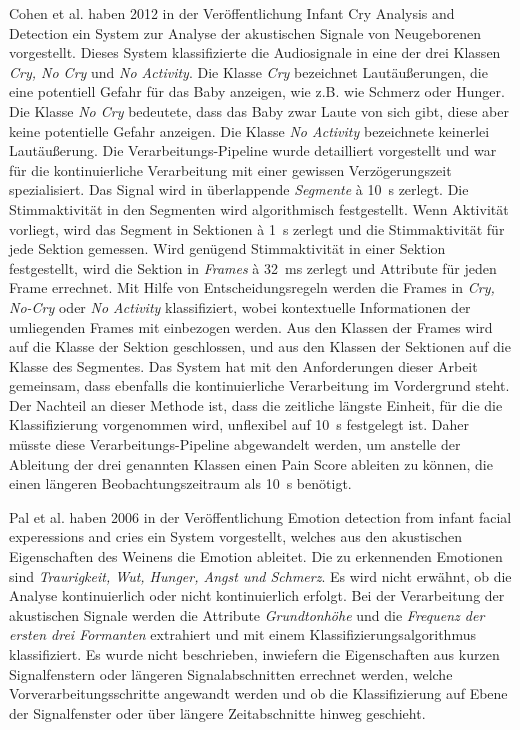 Cohen et al. haben 2012 in der Veröffentlichung \glqq Infant Cry Analysis and Detection\grqq{} \cite{cohenCry}  ein System zur Analyse der akustischen Signale von Neugeborenen vorgestellt. Dieses System klassifizierte die Audiosignale in eine der drei Klassen \emph{Cry, No Cry} und \emph{No Activity}. Die Klasse \emph{Cry} bezeichnet Lautäußerungen, die eine potentiell Gefahr für das Baby anzeigen, wie z.B. wie Schmerz oder Hunger. Die Klasse \emph{No Cry} bedeutete, dass das Baby zwar Laute von sich gibt, diese aber keine potentielle Gefahr anzeigen. Die Klasse \emph{No Activity} bezeichnete keinerlei Lautäußerung. Die Verarbeitungs-Pipeline wurde detailliert vorgestellt und war für die kontinuierliche Verarbeitung mit einer gewissen Verzögerungszeit spezialisiert. Das Signal wird in überlappende \emph{Segmente} \`{a} \SI{10}{\second} zerlegt. Die Stimmaktivität in den Segmenten wird algorithmisch festgestellt. Wenn Aktivität vorliegt, wird das Segment in Sektionen \`{a} \SI{1}{\second} zerlegt und die Stimmaktivität für jede Sektion gemessen. Wird genügend Stimmaktivität in einer Sektion festgestellt, wird die Sektion in \emph{Frames} \`{a} \SI{32}{\milli\second} zerlegt und Attribute für jeden Frame errechnet. Mit Hilfe von Entscheidungsregeln werden die Frames in \emph{Cry, No-Cry} oder \emph{No Activity} klassifiziert, wobei kontextuelle Informationen der umliegenden Frames mit einbezogen werden. Aus den Klassen der Frames wird auf die Klasse der Sektion geschlossen, und aus den Klassen der Sektionen auf die Klasse des Segmentes. Das System hat mit den Anforderungen dieser Arbeit gemeinsam, dass ebenfalls die kontinuierliche Verarbeitung im Vordergrund steht. Der Nachteil an dieser Methode ist, dass die zeitliche längste Einheit, für die die Klassifizierung vorgenommen wird, unflexibel auf \SI{10}{\second} festgelegt ist. Daher müsste diese Verarbeitungs-Pipeline abgewandelt werden, um anstelle der Ableitung der drei genannten Klassen einen Pain Score ableiten zu können, die einen längeren Beobachtungszeitraum als \SI{10}{\second} benötigt.

Pal et al.  haben 2006 in der Veröffentlichung \glqq Emotion detection from infant facial experessions and cries\grqq{} \cite{palEmotion} ein System vorgestellt, welches aus den akustischen Eigenschaften des Weinens die Emotion ableitet. Die zu erkennenden Emotionen sind \emph{Traurigkeit, Wut, Hunger, Angst und Schmerz}. Es wird nicht erwähnt, ob die Analyse kontinuierlich oder nicht kontinuierlich erfolgt. Bei der Verarbeitung der akustischen Signale werden die Attribute \emph{Grundtonhöhe} und die \emph{Frequenz der ersten drei Formanten} extrahiert und mit einem Klassifizierungsalgorithmus klassifiziert. Es wurde nicht beschrieben, inwiefern die Eigenschaften aus kurzen Signalfenstern oder längeren Signalabschnitten errechnet werden, welche Vorverarbeitungsschritte angewandt werden und ob die Klassifizierung auf Ebene der Signalfenster oder über längere Zeitabschnitte hinweg geschieht.

